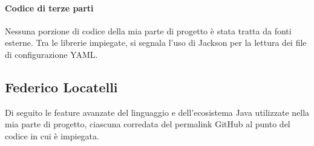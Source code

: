 \documentclass[11pt, a4paper, oneside]{report}
\begin{document}
\paragraph{Codice di terze parti}
Nessuna porzione di codice della mia parte di progetto è stata tratta da fonti esterne. Tra le librerie impiegate, si segnala l'uso di Jackson per la lettura dei file di configurazione YAML.

\subsection{Federico Locatelli}
Di seguito le feature avanzate del linguaggio e dell'ecosistema Java
utilizzate nella mia parte di progetto, ciascuna corredata del permalink
GitHub al punto del codice in cui è impiegata.
\end{document}
